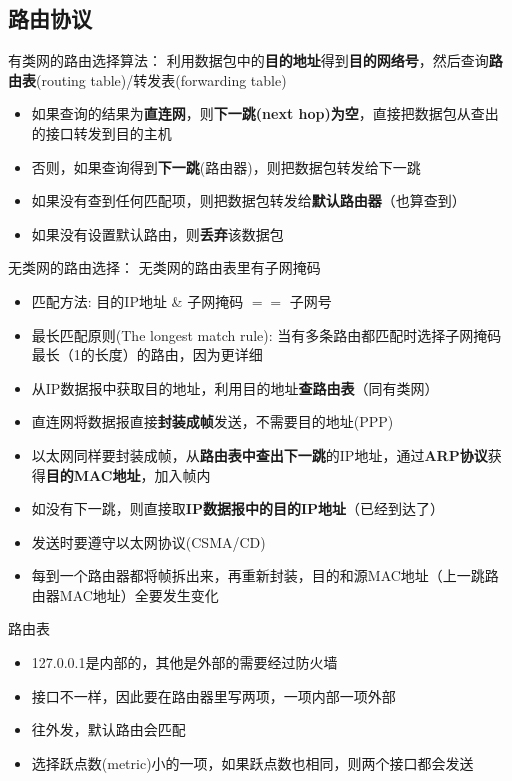 \subsection{路由协议}
有类网的路由选择算法：
利用数据包中的\textbf{目的地址}得到\textbf{目的网络号}，然后查询\textbf{路由表}(routing table)/转发表(forwarding table)
\begin{itemize}
	\item 如果查询的结果为\textbf{直连网}，则\textbf{下一跳(next hop)为空}，直接把数据包从查出的接口转发到目的主机
	\item 否则，如果查询得到\textbf{下一跳}(路由器)，则把数据包转发给下一跳
	\item 如果没有查到任何匹配项，则把数据包转发给\textbf{默认路由器}（也算查到）
	\item 如果没有设置默认路由，则\textbf{丢弃}该数据包
\end{itemize}

无类网的路由选择：
无类网的路由表里有子网掩码
\begin{itemize}
	\item 匹配方法: 目的IP地址 \& 子网掩码 $==$ 子网号
	\item 最长匹配原则(The longest match rule): 当有多条路由都匹配时选择子网掩码最长（1的长度）的路由，因为更详细
	\item 从IP数据报中获取目的地址，利用目的地址\textbf{查路由表}（同有类网）
	\item 直连网将数据报直接\textbf{封装成帧}发送，不需要目的地址(PPP)
	\item 以太网同样要封装成帧，从\textbf{路由表中查出下一跳}的IP地址，通过\textbf{ARP协议}获得\textbf{目的MAC地址}，加入帧内
	\item 如没有下一跳，则直接取\textbf{IP数据报中的目的IP地址}（已经到达了）
	\item 发送时要遵守以太网协议(CSMA/CD)
	\item 每到一个路由器都将帧拆出来，再重新封装，目的和源MAC地址（上一跳路由器MAC地址）全要发生变化
\end{itemize}

路由表
\begin{itemize}
	\item 127.0.0.1是内部的，其他是外部的需要经过防火墙
	\item 接口不一样，因此要在路由器里写两项，一项内部一项外部
	\item 往外发，默认路由会匹配
	\item 选择跃点数(metric)小的一项，如果跃点数也相同，则两个接口都会发送
\end{itemize}

